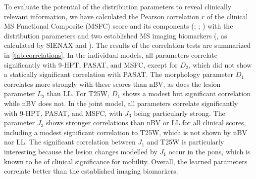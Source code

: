 To evaluate the potential of the distribution parameters to reveal clinically
relevant information, we have calculated the Pearson correlation $r$ of the
clinical MS Functional Composite (MSFC) score \citep{fischer1999} and its
components (; ; ) with
the distribution parameters and two established MS imaging biomarkers
(, as calculated by SIENAX
\citep{smith2002} and ). The results of the
correlation tests are summarized in \ref{tab:correlations}. In the individual
models, all parameters correlate significantly with 9-HPT, PASAT, and MSFC,
except for $D_2$, which did not show a statically significant correlation with
PASAT. The morphology parameter $D_1$ correlates more strongly with these scores
than nBV, as does the lesion parameter $L_2$ than LL. For T25W, $D_1$ shows a
modest but significant correlation while nBV does not. In the joint model, all
parameters correlate significantly with 9-HPT, PASAT, and MSFC, with $J_3$ being
particularly strong. The parameter $J_3$ shows stronger correlations than nBV or
LL for all clinical scores, including a modest significant correlation to T25W,
which is not shown by nBV nor LL. The significant correlation between $J_1$ and
T25W is particularly interesting because the lesion changes modelled by $J_1$
occur in the pons, which is known to be of clinical significance for mobility.
Overall, the learned parameters correlate better than the established imaging
biomarkers.

